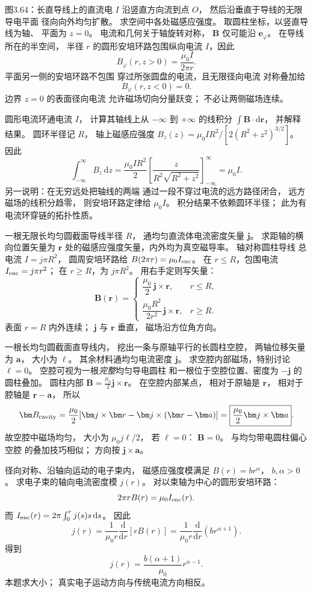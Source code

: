 图3.64：长直导线上的直流电
$I$ 沿竖直方向流到点 $O$，
然后沿垂直于导线的无限导电平面
径向向外均匀扩散。
求空间中各处磁感应强度。
\exsolution
取圆柱坐标，以竖直导线为轴、
平面为 $z=0$。
电流和几何关于轴旋转对称，
$\bm B$ 仅可能沿 $\bm e_\varphi$。
在导线所在的半空间，
半径 $r$ 的圆形安培环路包围纵向电流
$I$，因此
\[
\boxed{B_\varphi(r,z>0)=
\frac{\mu_0I}{2\pi r}}.
\]
平面另一侧的安培环路不包围
穿过所张圆盘的电流，且无限径向电流
对称叠加给
\[
\boxed{B_\varphi(r,z<0)=0}.
\]
\excheck 边界 $z=0$ 的表面径向电流
允许磁场切向分量跃变；
不必让两侧磁场连续。

圆形电流环通电流 $I$，
计算其轴线上从 $-\infty$ 到
$+\infty$ 的线积分
$\int\bm B\cdot\mathrm d\bm r$，
并解释结果。
\exsolution
圆环半径记 $R$，
轴上磁感应强度
$B_z(z)=\mu_0IR^2/[2(R^2+z^2)^{3/2}]$。
因此
\[
\int_{-\infty}^{\infty}B_z\,\mathrm dz
=\frac{\mu_0IR^2}{2}
\left[\frac{z}{R^2\sqrt{R^2+z^2}}\right]_{-\infty}^{\infty}
=\boxed{\mu_0I}.
\]
另一说明：在无穷远处把轴线的两端
通过一段不穿过电流的远方路径闭合，
远方磁场的线积分趋零，
则安培环路定律给 $\mu_0I$。
\excheck 积分结果不依赖圆环半径；
此为有电流环穿链的拓扑性质。

一根无限长均匀圆截面导线半径 $R$，
通均匀直流体电流密度矢量 $\bm j$。
求距轴的横向位置矢量为 $\bm r$
处的磁感应强度矢量，内外均为真空磁导率。
\exsolution
轴对称圆柱导线
总电流 $I=j\pi R^2$，
圆周安培环路给
$B(2\pi r)=\mu_0I_{\rm enc}$。
在 $r\le R$，包围电流
$I_{\rm enc}=j\pi r^2$；
在 $r\ge R$，为
$j\pi R^2$。
用右手定则写矢量：
\[
\boxed{\bm B(\bm r)=
\begin{cases}
\dfrac{\mu_0}{2}\,\bm j\times\bm r,
&r\le R,\\[2mm]
\dfrac{\mu_0R^2}{2r^2}\,
\bm j\times\bm r,&r\ge R.
\end{cases}}
\]
\excheck 表面 $r=R$ 内外连续；
$\bm j$ 与 $\bm r$ 垂直，
磁场沿方位角方向。

一根长均匀圆截面直导线内，
挖出一条与原轴平行的长圆柱空腔，
两轴位移矢量为 $\bm a$，
大小为 $\ell$。
其余材料通均匀电流密度 $\bm j$。
求空腔内部磁场，特别讨论 $\ell=0$。
\exsolution
空腔可视为一根\emph{完整}均匀导电圆柱
和一根位于空腔位置、密度为 $-\bm j$
的圆柱叠加。
圆柱内部
$\bm B=\frac{\mu_0}{2}\bm j\times\bm r$。
在空腔内部某点，
相对于原轴是 $\bm r$，
相对于腔轴是 $\bm r-\bm a$，
所以
\[
\bm B_{\rm cavity}=
\frac{\mu_0}{2}
[\bm j\times\bm r-\bm j\times(\bm r-\bm a)]
=\boxed{\frac{\mu_0}{2}\bm j\times\bm a}.
\]
故空腔中磁场均匀，
大小为 $\mu_0j\ell/2$，
若 $\ell=0$：
$\boxed{\bm B=0}$。
\excheck 与均匀带电圆柱偏心空腔
的叠加技巧相似；
方向按 $\bm j\times\bm a$。

径向对称、沿轴向运动的电子束内，
磁感应强度模满足
$B(r)=br^\alpha$，
$b,\alpha>0$。
求电子束的轴向电流密度模 $j(r)$。
\exsolution
对以束轴为中心的圆形安培环路：
\[
2\pi r B(r)=\mu_0 I_{\rm enc}(r).
\]
而
$I_{\rm enc}(r)=2\pi\int_0^rj(s)s\,\mathrm ds$。
因此
\[
j(r)=\frac1{\mu_0r}
\frac{\mathrm d}{\mathrm dr}[rB(r)]
=\frac1{\mu_0r}\frac{\mathrm d}{\mathrm dr}
(br^{\alpha+1}).
\]
得到
\[
\boxed{j(r)=\frac{b(\alpha+1)}{\mu_0}
r^{\alpha-1}}.
\]
\excheck 本题求大小；
真实电子运动方向与传统电流方向相反。
